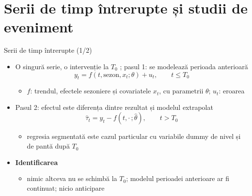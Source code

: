 \section{Serii de timp întrerupte și studii de eveniment}

\begin{frame}{Serii de timp întrerupte (1/2)}
\itemsize{\small}
\begin{itemize}
    \item O singură serie, o intervenție la $T_0$ ; pasul 1: se modelează perioada anterioară \[ y_t = f(t, \text{sezon}, x_t; \theta) + u_t, \qquad t \le T_0 \]
    \begin{itemize}
        \item $f$: trendul, efectele sezoniere și covariatele $x_t$, cu parametrii $\theta$; $u_t$: eroarea
    \end{itemize}
    \item Pasul 2: efectul este diferența dintre rezultat și modelul extrapolat \[ \hat\tau_t = y_t - f(t, \cdot\,; \hat\theta), \qquad t > T_0 \]
    \begin{itemize}
        \item regresia segmentată este cazul particular cu variabile dummy de nivel și de pantă după $T_0$
    \end{itemize}
    \item \textbf{Identificarea}
    \begin{itemize}
        \item nimic altceva nu se schimbă la $T_0$; modelul perioadei anterioare ar fi continuat; nicio anticipare
    \end{itemize}
\end{itemize}
\end{frame}

